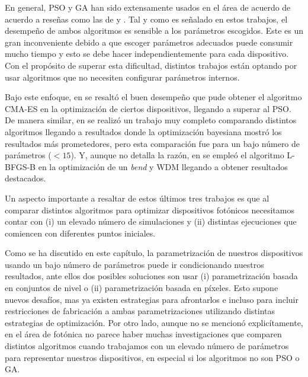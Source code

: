 En general, PSO y GA han sido extensamente usados en el área de acuerdo de acuerdo a reseñas como las de
\cite{Elsawy2020} y \cite{Campbell2019}. Tal y como es señalado en estos trabajos, el desempeño de ambos
algoritmos es sensible a los parámetros escogidos. Este es un gran inconveniente debido a que escoger
parámetros adecuados puede consumir mucho tiempo y esto se debe hacer independientemente para cada
dispositivo. Con el propósito de superar esta dificultad, distintos trabajos están optando por usar algoritmos
que no necesiten configurar parámetros internos.


Bajo este enfoque, en \cite{Gregory2015} se resaltó el buen desempeño que pude obtener el algoritmo CMA-ES en
la optimización de ciertos dispositivos, llegando a superar al PSO.
De manera similar, en \cite{Schneider2019} se realizó un trabajo muy completo comparando distintos algoritmos
llegando a resultados donde la optimización bayesiana mostró los resultados más prometedores,
pero esta comparación fue para un bajo número de parámetros ($< 15$).
Y, aunque no detalla la razón, en \cite{Su2020} se empleó el algoritmo 
L-BFGS-B en la optimización de un \emph{bend} y WDM llegando a obtener resultados destacados.

Un aspecto importante a resaltar de estos últimos tres trabajos es que al comparar distintos algoritmos para
optimizar dispositivos fotónicos necesitamos contar con
(i) un elevado número de simulaciones y
(ii) distintas ejecuciones que comiencen con diferentes puntos iniciales.

Como se ha discutido en este capítulo, la parametrización de nuestros dispositivos usando un bajo número
de parámetros puede ir condicionando nuestros resultados, ante ellos dos posibles soluciones son usar
(i) parametrización basada en conjuntos de nivel o (ii) parametrización basada en píxeles. 
Esto supone nuevos desafíos, mas ya existen estrategias para afrontarlos e
incluso para incluir restricciones de fabricación a ambas parametrizaciones
utilizando distintas estrategias de optimización.
Por otro lado, aunque no se mencionó explicítamente, en el área de fotónica no parece haber muchas
investigaciones que comparen distintos algoritmos cuando trabajamos con un 
elevado número de parámetros para representar nuestros dispositivos, 
en especial si los algoritmos no son PSO o GA.
